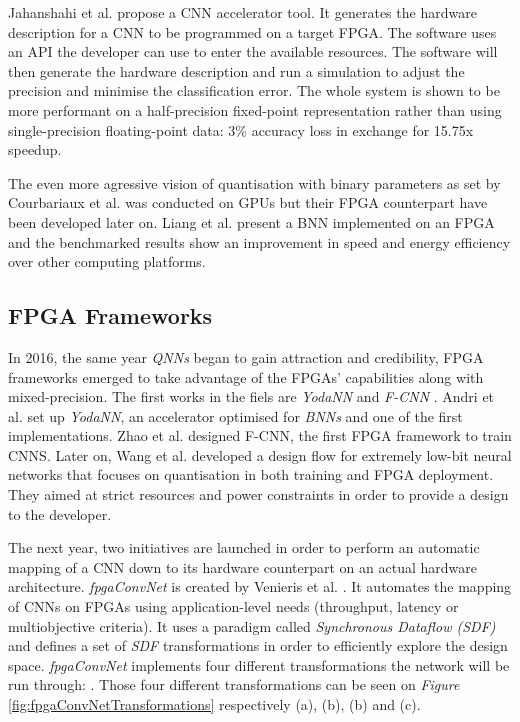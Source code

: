 Jahanshahi et al. \cite{Jahanshahi2019} propose a CNN accelerator tool. It generates the hardware description for a CNN to be programmed on a target FPGA. The software uses an API the developer can use to enter the available resources. The software will then generate the hardware description and run a simulation to adjust the precision and minimise the classification error. The whole system is shown to be more performant on a half-precision fixed-point representation rather than using single-precision floating-point data: 3\% accuracy loss in exchange for 15.75x speedup.

The even more agressive vision of quantisation with binary parameters as set by Courbariaux et al. \cite{Courbariaux2016} was conducted on GPUs but their FPGA counterpart have been developed later on. Liang et al. \cite{Liang2017} present a BNN implemented on an FPGA and the benchmarked results show an improvement in speed and energy efficiency over other computing platforms.



\subsection{FPGA Frameworks}

In 2016, the same year \emph{QNNs} began to gain attraction and credibility, FPGA frameworks emerged to take advantage of the FPGAs' capabilities along with mixed-precision. The first works in the fiels are \emph{YodaNN} \cite{Andri2016} and \emph{F-CNN} \cite{Zhao2016}. Andri et al. set up \emph{YodaNN}, an accelerator optimised for \emph{BNNs} and one of the first implementations. Zhao et al. \cite{Zhao2016} designed F-CNN, the first FPGA framework to train CNNS. Later on, Wang et al. \cite{Wang2018} developed a design flow for extremely low-bit neural networks that focuses on quantisation in both training and FPGA deployment. They aimed at strict resources and power constraints in order to provide a design to the developer.

The next year, two initiatives are launched in order to perform an automatic mapping of a CNN down to its hardware counterpart on an actual hardware architecture. \emph{fpgaConvNet} is created by Venieris et al. \cite{Venieris2017}. It automates the mapping of CNNs on FPGAs using application-level needs (throughput, latency or multiobjective criteria). It uses a paradigm called \emph{Synchronous Dataflow (SDF)} and defines a set of \emph{SDF} transformations in order to efficiently explore the design space. \emph{fpgaConvNet} implements four different transformations the network will be run through: . Those four different transformations can be seen on \emph{Figure} \ref{fig:fpgaConvNetTransformations} respectively (a), (b), (b) and (c).

